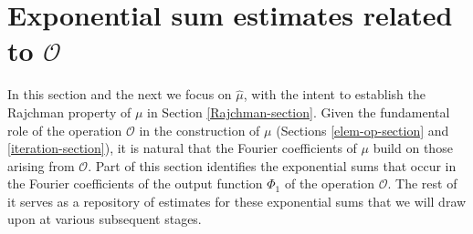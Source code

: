\documentclass[12pt, twoside]{article}
\theoremstyle{definition}
\numberwithin{equation}{section}
\begin{document}
\section{Exponential sum estimates related to $\mathscr{O}$} \label{exp-sum-section} 
In this section and the next we focus on $\widehat{\mu}$, with the intent to establish the Rajchman property of $\mu$ in Section \ref{Rajchman-section}. 
Given the fundamental role of the operation $\mathscr{O}$ in the construction of $\mu$ (Sections \ref{elem-op-section} and \ref{iteration-section}), it is natural that the Fourier coefficients of $\mu$ build on those arising from $\mathscr{O}$. Part of this section identifies the exponential sums that occur in the Fourier coefficients of  the output function  $\Phi_1$ of the operation $\mathscr{O}$. 
The rest of it serves as a repository of estimates for these exponential sums that we will draw upon at various subsequent stages. 
\end{document}
